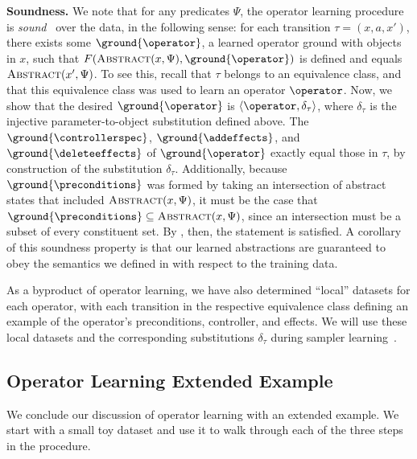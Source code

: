\textbf{Soundness.} We note that for any predicates $\Psi$, the operator learning procedure is \emph{sound}~\cite{konidaris2018skills} over the data, in the following sense: for each transition $\tau = (x, a, x')$, there exists some $\ground{\operator}$, a learned operator ground with objects in $x$, such that $F(\textsc{Abstract}(x, \Psi), \ground{\operator})$ is defined and equals $\textsc{Abstract}(x', \Psi)$. To see this, recall that $\tau$ belongs to an equivalence class, and that this equivalence class was used to learn an operator $\operator$.
Now, we show that the desired $\ground{\operator}$ is $\langle \operator, \delta_\tau \rangle$, where $\delta_\tau$ is the injective parameter-to-object substitution defined above. The $\ground{\controllerspec}$, $\ground{\addeffects}$, and $\ground{\deleteeffects}$ of $\ground{\operator}$ exactly equal those in $\tau$, by construction of the substitution $\delta_\tau$.
Additionally, because $\ground{\preconditions}$ was formed by taking an intersection of abstract states that included $\textsc{Abstract}(x, \Psi)$, it must be the case that $\ground{\preconditions} \subseteq \textsc{Abstract}(x, \Psi)$, since an intersection must be a subset of every constituent set.
By , then, the statement is satisfied.
A corollary of this soundness property is that our learned abstractions are guaranteed to obey the semantics we defined in  with respect to the training data.

As a byproduct of operator learning, we have also determined ``local'' datasets for each operator, with each transition in the respective equivalence class defining an example of the operator's preconditions, controller, and effects.
We will use these local datasets and the corresponding substitutions $\delta_\tau$ during sampler learning~.

\subsection{Operator Learning Extended Example}

We conclude our discussion of operator learning with an extended example.
We start with a small toy dataset and use it to walk through each of the three steps in the procedure.

